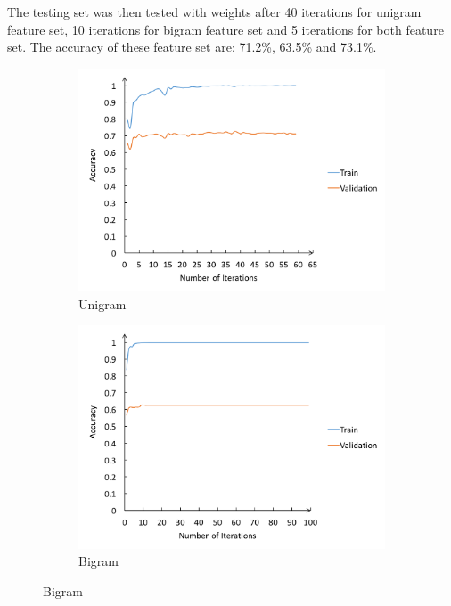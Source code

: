\documentclass[11pt]{article}
\begin{document}
The testing set was then tested with weights after 40 iterations for unigram feature set, 10 iterations for bigram feature set and 5 iterations for both feature set. The accuracy of these feature set are: 71.2\%, 63.5\% and 73.1\%.
\begin{figure}
\begin{subfigure}{0.31\textwidth}
\includegraphics[width=\linewidth]{perceptron_unigram.png}
\caption{Unigram} \label{fig:1a}
\end{subfigure}
\hspace*{\fill} %
\begin{subfigure}{0.31\textwidth}
\includegraphics[width=\linewidth]{perceptron_bigram.png}
\caption{Bigram} \label{fig:1b}
\end{subfigure}

\end{figure}
\end{document}
